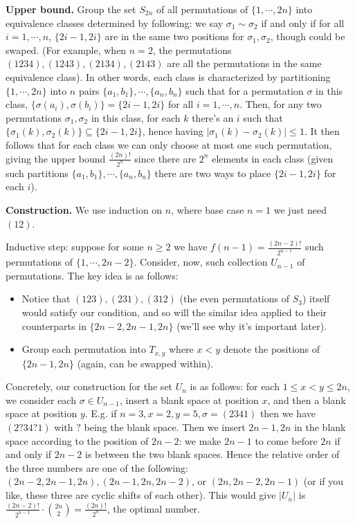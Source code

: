 \documentclass[11pt,a4paper]{article}
\begin{document}
\begin{enumerate}
        \textbf{Upper bound.} 
        Group the set $S_{2n}$ of all permutations of $\{1, \cdots, 2n\}$ into equivalence classes determined by following: we say $\sigma_1\sim \sigma_2$ if and only if for all $i=1, \cdots, n$, $\{2i-1, 2i\}$ are in the same two positions for $\sigma_1, \sigma_2$, though could be swaped. 
        (For example, when $n=2$, the permutations $(1234), (1243), (2134), (2143)$ are all the permutations in the same equivalence class). 
        In other words, each class is characterized by partitioning $\{1, \cdots, 2n\}$ into $n$ pairs 
        $\{a_1, b_1\}, \cdots, \{a_n, b_n\}$ such that for a permutation $\sigma$ in this class, 
        $\{\sigma(a_i), \sigma(b_i)\}=\{2i-1, 2i\}$ for all $i=1, \cdots, n$. 
        Then, for any two permutations $\sigma_1, \sigma_2$ in this class, for each $k$ there's an $i$ such that $\{\sigma_1(k), \sigma_2(k)\}\subseteq \{2i-1, 2i\}$, 
        hence having $|\sigma_1(k) -\sigma_2(k)|\le 1$. 
        It then follows that for each class we can only choose at most one such permutation, giving the upper bound 
        $\frac{(2n)!}{2^{n}}$ since there are $2^n$ elements in each class 
        (given such partitions $\{a_1, b_1\}, \cdots, \{a_n, b_n\}$ there are two ways to place $\{2i-1, 2i\}$ for each $i$). 
        
        \textbf{Construction.} 
        We use induction on $n$, where base case $n=1$ we just need $(12)$. 
        
        Inductive step: suppose for some $n\ge 2$ we have $f(n-1)=\frac{(2n-2)!}{2^{n-1}}$ such permutations of $\{1, \cdots, 2n-2\}$. Consider, now, such collection $U_{n-1}$ of permutations. 
        The key idea is as follows: 
        \begin{itemize}
        	\item Notice that $(123), (231), (312)$ (the even permutations of $S_3$) itself would satisfy our condition, and so will the similar idea applied to their counterparts in $\{2n-2, 2n-1, 2n\}$ (we'll see why it's important later). 
        	
        	\item Group each permutation into $T_{x, y}$ where $x<y$ denote the positions of $\{2n-1, 2n\}$ (again, can be swapped within). 
        \end{itemize}
       
        Concretely, our construction for the set $U_n$ is as follows: for each $1\le x < y\le 2n$, we consider each $\sigma\in U_{n-1}$, insert a blank space at position $x$, and then a blank space at position $y$. E.g. if $n=3, x=2, y=5, \sigma=(2341)$ then we have $(2?34?1)$ with $?$ being the blank space. 
        Then we insert $2n-1, 2n$ in the blank space according to the position of $2n-2$: we make $2n-1$ to come before $2n$ if and only if $2n-2$ is between the two blank spaces. 
        Hence the relative order of the three numbers are one of the following: $(2n-2, 2n-1, 2n), (2n-1, 2n, 2n-2)$, or $(2n, 2n-2, 2n-1)$ (or if you like, these three are cyclic shifts of each other). 
        This would give $|U_n|$ is $\frac{(2n-2)!}{2^{n-1}}\cdot \binom{2n}{2} = \frac{(2n)!}{2^n}$, 
        the optimal number. 
        

\end{enumerate}
\end{document}
